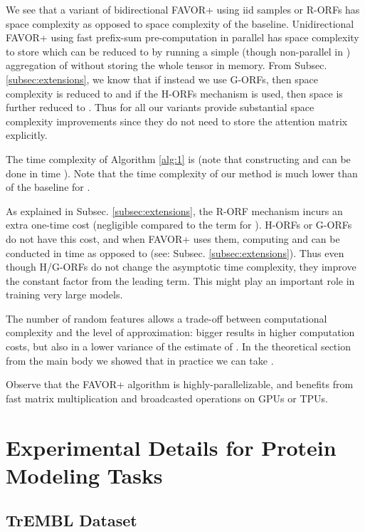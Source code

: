 We see that a variant of bidirectional FAVOR+ using iid samples or R-ORFs has  space complexity as opposed to  space complexity of the baseline. Unidirectional FAVOR+ using fast prefix-sum pre-computation in parallel \citep{cumsum, cormen} has  space complexity to store  which can be reduced to  by running a simple (though non-parallel in ) aggregation of  without storing the whole tensor  in memory. From Subsec. \ref{subsec:extensions}, we know that if instead we use G-ORFs, then space complexity is reduced to  and if the H-ORFs mechanism is used, then space is further reduced to . Thus for  all our variants provide substantial space complexity improvements since they do not need to store the attention matrix explicitly.

The time complexity of Algorithm \ref{alg:1} is  (note that constructing  and  can be done in time ). Note that the time complexity of our method is much lower than  of the baseline for .

As explained in Subsec. \ref{subsec:extensions}, the R-ORF mechanism incurs an extra one-time  cost (negligible compared to the  term for ). H-ORFs or G-ORFs do not have this cost, and when FAVOR+ uses them, computing  and  can be conducted in time  as opposed to  (see: Subsec. \ref{subsec:extensions}). Thus even though H/G-ORFs do not change the asymptotic time complexity, they improve the constant factor from the leading term. This might play an important role in training very large models. 

The number of random features  allows a trade-off between computational complexity and the level of approximation: bigger  results in higher computation costs, but also in a lower variance of the estimate of . In the theoretical section from the main body we showed that in practice we can take .

Observe that the FAVOR+ algorithm is highly-parallelizable, and benefits from fast matrix multiplication and broadcasted operations on GPUs or TPUs.

\newpage

\section{Experimental Details for Protein Modeling Tasks}
\label{appendix:protein_extended}
\subsection{TrEMBL Dataset}

